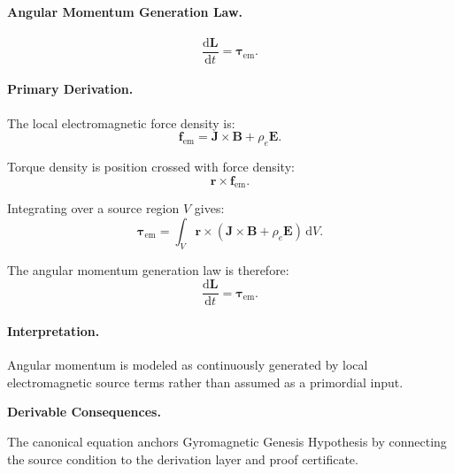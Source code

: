 \paragraph{Angular Momentum Generation Law.}
\begin{equation}
\frac{\mathrm{d}\mathbf{L}}{\mathrm{d}t}
=
\boldsymbol{\tau}_{\mathrm{em}} .
\end{equation}

\paragraph{Primary Derivation.}
The local electromagnetic force density is:
\begin{equation}
\mathbf{f}_{\mathrm{em}}
=
\mathbf{J}\times\mathbf{B}
+
\rho_e\mathbf{E}.
\end{equation}

Torque density is position crossed with force density:
\begin{equation}
\mathbf{r}\times\mathbf{f}_{\mathrm{em}}.
\end{equation}

Integrating over a source region $V$ gives:
\begin{equation}
\boldsymbol{\tau}_{\mathrm{em}}
=
\int_V
\mathbf{r}\times
\left(
\mathbf{J}\times\mathbf{B}
+
\rho_e\mathbf{E}
\right)
\,\mathrm{d}V .
\end{equation}

The angular momentum generation law is therefore:
\begin{equation}
\boxed{
\frac{\mathrm{d}\mathbf{L}}{\mathrm{d}t}
=
\boldsymbol{\tau}_{\mathrm{em}} .
}
\end{equation}

\paragraph{Interpretation.}
Angular momentum is modeled as continuously generated by local electromagnetic source terms rather than assumed as a primordial input.

\par\vspace{0.35em}
\noindent\textbf{Derivable Consequences.}\quad
\begingroup
\footnotesize
\raggedright
The canonical equation anchors Gyromagnetic Genesis Hypothesis by connecting the source condition to the derivation layer and proof certificate.
\par\endgroup

